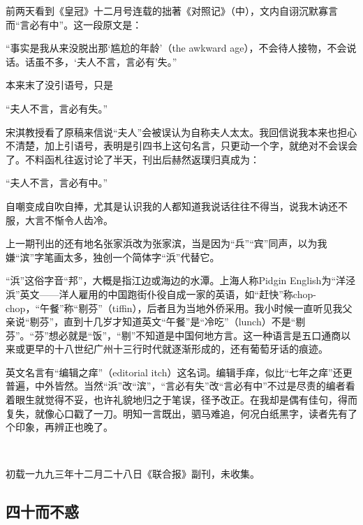 \par 前两天看到《皇冠》十二月号连载的拙著《对照记》（中），文内自诩沉默寡言而“言必有中”。这一段原文是：
\par “事实是我从来没脱出那‘尴尬的年龄’（the awkward age），不会待人接物，不会说话。话虽不多，‘夫人不言，言必有’失。”
\par 本来末了没引语号，只是
\par “夫人不言，言必有失。”
\par 宋淇教授看了原稿来信说“夫人”会被误认为自称夫人太太。我回信说我本来也担心不清楚，加上引语号，表明是引四书上这句名言，只更动一个字，就绝对不会误会了。不料函札往返讨论了半天，刊出后赫然返璞归真成为：
\par “夫人不言，言必有中。”
\par 自嘲变成自吹自捧，尤其是认识我的人都知道我说话往往不得当，说我木讷还不服，大言不惭令人齿冷。
\par 上一期刊出的还有地名张家浜改为张家滨，当是因为“兵”“宾”同声，以为我嫌“滨”字笔画太多，独创一个简体字“浜”代替它。
\par “浜”这俗字音“邦”，大概是指江边或海边的水潭。上海人称Pidgin English为“洋泾浜”英文——洋人雇用的中国跑街仆役自成一家的英语，如“赶快”称chop-chop，“午餐”称“剔芬”（tiffin），后者且为当地外侨采用。我小时候一直听见我父亲说“剔芬”，直到十几岁才知道英文“午餐”是“冷吃”（lunch）不是“剔芬”。“芬”想必就是“饭”，“剔”不知道是中国何地方言。这一种语言是五口通商以来或更早的十八世纪广州十三行时代就逐渐形成的，还有葡萄牙话的痕迹。
\par 英文名言有“编辑之痒”（editorial itch）这名词。编辑手痒，似比“七年之痒”还更普遍，中外皆然。当然“浜”改“滨”，“言必有失”改“言必有中”不过是尽责的编者看着眼生就觉得不妥，也许礼貌地归之于笔误，径予改正。在我却是偶有佳句，得而复失，就像心口戳了一刀。明知一言既出，驷马难追，何况白纸黑字，读者先有了个印象，再辨正也晚了。
\par  
\par *初载一九九三年十二月二十八日《联合报》副刊，未收集。



\subsection{四十而不惑}


